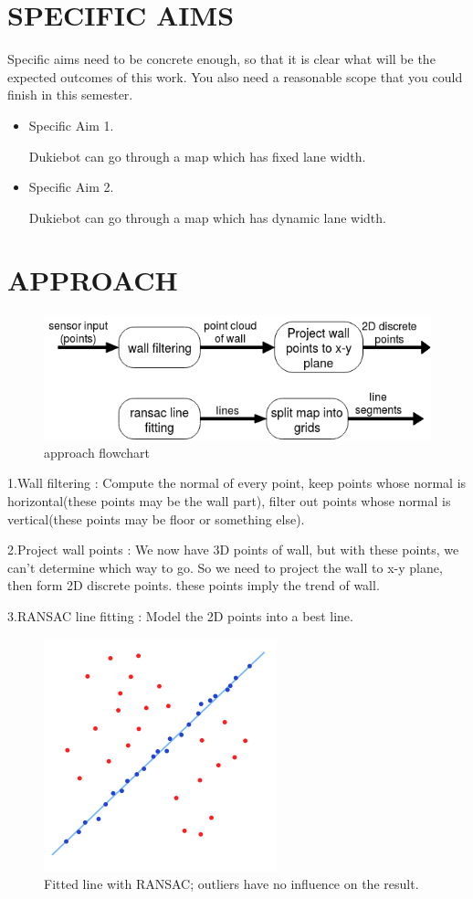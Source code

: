 \documentclass[letterpaper, 10 pt, conference]{ieeeconf}  %
\begin{document}
\section{SPECIFIC AIMS}

Specific aims need to be concrete enough, so that it is clear what will be the expected outcomes of this work. You also need a reasonable scope that you could finish in this semester.

\begin{itemize}
\item Specific Aim 1.

Dukiebot can go through a map which has fixed lane width.
\item Specific Aim 2.

Dukiebot can go through a map which has dynamic lane width.
\end{itemize}

\section{APPROACH}


\begin{figure}[h] %
\includegraphics[width=1.0\columnwidth]{approach1.png}
\centering
\caption{approach flowchart}
\end{figure}
1.Wall filtering : Compute the normal of every point, keep points whose normal is horizontal(these points may be the wall part), filter out points whose normal is vertical(these points may be floor or something else).

2.Project wall points : We now have 3D points of wall, but with these points, we can't determine which way to go. So we need to project the wall to x-y plane, then form 2D discrete points. these points imply the trend of wall.  

3.RANSAC line fitting : Model the 2D points into a best line.
\begin{figure}[h] %
\includegraphics[width=0.5\columnwidth]{RANSAC.png}
\centering
\caption{Fitted line with RANSAC; outliers have no influence on the result.}
\end{figure}
\end{document}
